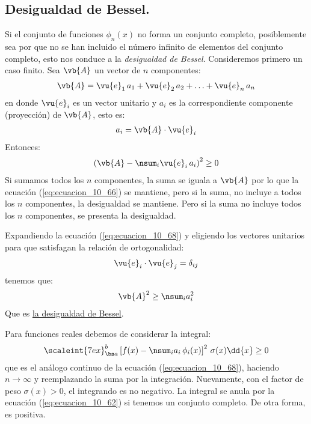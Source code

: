 \subsection{Desigualdad de Bessel.}

Si el conjunto de funciones $\phi_{n} (x)$ no forma un conjunto completo, posiblemente sea por que no se han incluido el número infinito de elementos del conjunto completo, esto nos conduce a la \emph{desigualdad de Bessel}. Consideremos primero un caso finito. Sea $\vb{A}$ un vector de $n$ componentes:
\begin{align}
\vb{A} = \vu{e}_{1} \, a_{1} + \vu{e}_{2} \, a_{2} + \ldots + \vu{e}_{n} \, a_{n} 
\label{eq:ecuacion_10_66}
\end{align}
en donde $\vu{e}_{i}$ es un vector unitario y $a_{i}$ es la correspondiente componente (proyección) de $\vb{A}$, esto es:
\begin{align}
a_{i} = \vb{A} \cdot \vu{e}_{i}
\label{eq:ecuacion_10_67}
\end{align}
Entonces:
\begin{align}
\left( \vb{A} - \nsum_{i} \vu{e}_{i} \, a_{i} \right)^{2} \geq 0
\label{eq:ecuacion_10_68}
 \end{align}
Si sumamos todos los $n$ componentes, la suma se iguala a $\vb{A}$ por lo que la ecuación (\ref{eq:ecuacion_10_66}) se mantiene, pero si la suma, no incluye a todos los $n$ componentes, la desigualdad se mantiene. Pero si la suma no incluye todos los $n$ componentes, se presenta la desigualdad.
\par
Expandiendo la ecuación (\ref{eq:ecuacion_10_68}) y eligiendo los vectores unitarios para que satisfagan la relación de ortogonalidad:
\begin{align}
\vu{e}_{i} \cdot \vu{e}_{j} =  \delta_{ij}
\label{eq:ecuacion_10_69}
\end{align}
tenemos que:
\begin{align}
\vb{A}^{2} \geq \nsum_{i} a_{i}^{2}
\label{eq:ecuacion_10_70}
\end{align}
Que es \underline{la desigualdad de Bessel}.
\par
Para funciones reales debemos de considerar la integral:
\begin{align}
\scaleint{7ex}_{\bs a}^{b} \left[ f(x) - \nsum_{i} a_{i} \, \phi_{i}(x) \right]^{2} \, \sigma (x) \dd{x} \geq 0
\label{eq:ecuacion_10_71}
\end{align}
que es el análogo continuo de la ecuación (\ref{eq:ecuacion_10_68}), haciendo $n \to \infty$ y reemplazando la suma por la integración. Nuevamente, con el factor de peso $\sigma (x) > 0 $, el integrando es no negativo. La integral se anula por la ecuación (\ref{eq:ecuacion_10_62}) si tenemos un conjunto completo. De otra forma, es positiva.

